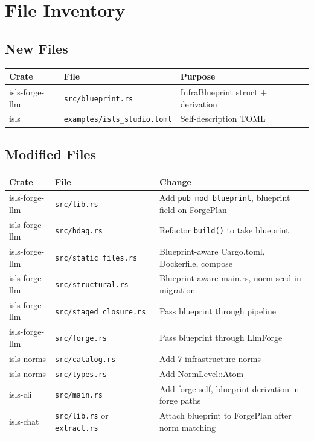 \documentclass[11pt,a4paper]{article}
\begin{document}
\section{File Inventory}

\subsection{New Files}

\begin{longtable}{llp{7cm}}
\toprule
\textbf{Crate} & \textbf{File} & \textbf{Purpose} \\
\midrule
isls-forge-llm & \texttt{src/blueprint.rs}
  & InfraBlueprint struct + derivation \\
isls & \texttt{examples/isls\_studio.toml}
  & Self-description TOML \\
\bottomrule
\end{longtable}

\subsection{Modified Files}

\begin{longtable}{llp{7cm}}
\toprule
\textbf{Crate} & \textbf{File} & \textbf{Change} \\
\midrule
isls-forge-llm & \texttt{src/lib.rs}
  & Add \texttt{pub mod blueprint}, blueprint field on ForgePlan \\
isls-forge-llm & \texttt{src/hdag.rs}
  & Refactor \texttt{build()} to take blueprint \\
isls-forge-llm & \texttt{src/static\_files.rs}
  & Blueprint-aware Cargo.toml, Dockerfile, compose \\
isls-forge-llm & \texttt{src/structural.rs}
  & Blueprint-aware main.rs, norm seed in migration \\
isls-forge-llm & \texttt{src/staged\_closure.rs}
  & Pass blueprint through pipeline \\
isls-forge-llm & \texttt{src/forge.rs}
  & Pass blueprint through LlmForge \\
isls-norms & \texttt{src/catalog.rs}
  & Add 7 infrastructure norms \\
isls-norms & \texttt{src/types.rs}
  & Add NormLevel::Atom \\
isls-cli & \texttt{src/main.rs}
  & Add forge-self, blueprint derivation in forge paths \\
isls-chat & \texttt{src/lib.rs} or \texttt{extract.rs}
  & Attach blueprint to ForgePlan after norm matching \\
\bottomrule
\end{longtable}
\end{document}
